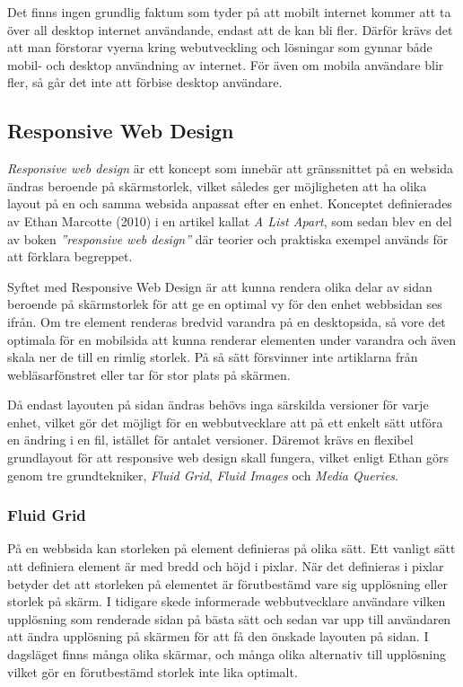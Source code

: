 \documentclass[11pt]{article}
\begin{document}
Det finns ingen grundlig faktum som tyder på att mobilt internet kommer att ta över all desktop internet användande, endast att de kan bli fler. Därför krävs det att man förstorar vyerna kring webutveckling och lösningar som gynnar både mobil- och desktop användning av internet. För även om mobila användare blir fler, så går det inte att förbise desktop användare.

\subsection{Responsive Web Design}

\textit{Responsive web design} är ett koncept som innebär att gränssnittet på en websida ändras beroende på skärmstorlek, vilket således ger möjligheten att ha olika layout på en och samma websida anpassat efter en enhet. Konceptet definierades av Ethan Marcotte (2010) i en artikel kallat \textit{A List Apart}, som sedan blev en del av boken \textit{”responsive web design”} där teorier och praktiska exempel används för att förklara begreppet. 

Syftet med Responsive Web Design är att kunna rendera olika delar av sidan beroende på skärmstorlek för att ge en optimal vy för den enhet webbsidan ses ifrån. Om tre element renderas bredvid varandra på en desktopsida, så vore det optimala för en mobilsida att kunna renderar elementen under varandra och även skala ner de till en rimlig storlek. På så sätt försvinner inte artiklarna från webläsarfönstret eller tar för stor plats på skärmen.

Då endast layouten på sidan ändras behövs inga särskilda versioner för varje enhet, vilket gör det möjligt för en webbutvecklare att på ett enkelt sätt utföra en ändring i en fil, istället för antalet versioner. Däremot krävs en flexibel grundlayout för att responsive web design skall fungera, vilket enligt Ethan görs genom tre grundtekniker, \textit{Fluid Grid}, \textit{Fluid Images} och \textit{Media Queries}.

\subsubsection{Fluid Grid}
På en webbsida kan storleken på element definieras på olika sätt. Ett vanligt sätt att definiera element är med bredd och höjd i pixlar. När det definieras i pixlar betyder det att storleken på elementet är förutbestämd vare sig upplösning eller storlek på skärm. I tidigare skede informerade webbutvecklare användare vilken upplösning som renderade sidan på bästa sätt och sedan var upp till användaren att ändra upplösning på skärmen för att få den önskade layouten på sidan. I dagsläget finns många olika skärmar, och många olika alternativ till upplösning vilket gör en förutbestämd storlek inte lika optimalt. 
\end{document}
